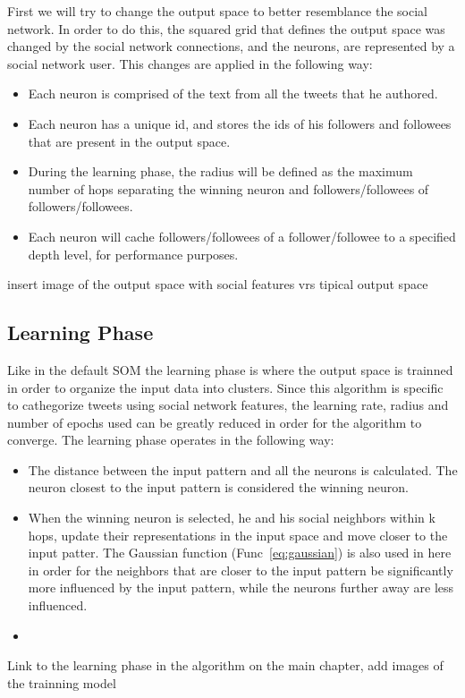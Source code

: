 First we will try to change the output space to better resemblance the social network. In order to do this, the squared grid that defines the output space was changed by the social network connections, and the neurons, are represented by a social network user. This changes are applied in the following way:
\begin{itemize}
  \item Each neuron is comprised of the text from all the tweets that he authored.
  \item Each neuron has a unique id, and stores the ids of his followers and followees that are present in the output space.
  \item During the learning phase, the radius will be defined as the maximum number of hops separating the winning neuron and followers/followees of followers/followees. 
  \item Each neuron will cache followers/followees of a follower/followee to a specified depth level, for performance purposes. 
\end{itemize}

{\color{red} insert image of the output space with social features vrs tipical output space}

\subsection{Learning Phase}
\label{sub:learning_phase}
Like in the default \ac{SOM} the learning phase is where the output space is trainned in order to organize the input data into clusters. Since this algorithm is specific to cathegorize tweets using social network features, the learning rate, radius and number of epochs used can be greatly reduced in order for the algorithm to converge. The learning phase operates in the following way:

\begin{itemize}
  \item The distance between the input pattern and all the neurons is calculated. The neuron closest to the input pattern is considered the winning neuron.
  \item When the winning neuron is selected, he and his social neighbors within k hops, update their representations in the input space and move closer to the input patter. The Gaussian function (Func~\ref{eq:gaussian}) is also used in here in order for the neighbors that are closer to the input pattern be significantly more influenced by the input pattern, while the neurons further away are less influenced. 
    \item 
    
  
\end{itemize}

{\color{red} Link to the learning phase in the algorithm on the main chapter, add images of the trainning model }
